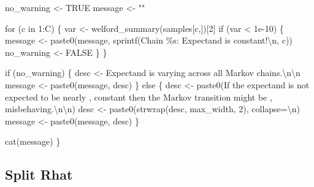 \documentclass[
  letterpaper,
  DIV=11,
  numbers=noendperiod]{scrartcl}
\newenvironment{Shaded}{\begin{snugshade}}{\end{snugshade}}
\newcommand{\AttributeTok}[1]{\textcolor[rgb]{0.40,0.45,0.13}{#1}}
\newcommand{\ConstantTok}[1]{\textcolor[rgb]{0.56,0.35,0.01}{#1}}
\newcommand{\ControlFlowTok}[1]{\textcolor[rgb]{0.00,0.23,0.31}{#1}}
\newcommand{\DecValTok}[1]{\textcolor[rgb]{0.68,0.00,0.00}{#1}}
\newcommand{\FloatTok}[1]{\textcolor[rgb]{0.68,0.00,0.00}{#1}}
\newcommand{\FunctionTok}[1]{\textcolor[rgb]{0.28,0.35,0.67}{#1}}
\newcommand{\NormalTok}[1]{\textcolor[rgb]{0.00,0.23,0.31}{#1}}
\newcommand{\OtherTok}[1]{\textcolor[rgb]{0.00,0.23,0.31}{#1}}
\newcommand{\SpecialCharTok}[1]{\textcolor[rgb]{0.37,0.37,0.37}{#1}}
\newcommand{\StringTok}[1]{\textcolor[rgb]{0.13,0.47,0.30}{#1}}
\begin{document}
\begin{Shaded}
\begin{Highlighting}[]
\NormalTok{  no\_warning }\OtherTok{\textless{}{-}} \ConstantTok{TRUE}
\NormalTok{  message }\OtherTok{\textless{}{-}} \StringTok{""}

  \ControlFlowTok{for}\NormalTok{ (c }\ControlFlowTok{in} \DecValTok{1}\SpecialCharTok{:}\NormalTok{C) \{}
\NormalTok{    var }\OtherTok{\textless{}{-}} \FunctionTok{welford\_summary}\NormalTok{(samples[c,])[}\DecValTok{2}\NormalTok{]}
    \ControlFlowTok{if}\NormalTok{ (var }\SpecialCharTok{\textless{}} \FloatTok{1e{-}10}\NormalTok{) \{}
\NormalTok{      message }\OtherTok{\textless{}{-}} \FunctionTok{paste0}\NormalTok{(message,}
                        \FunctionTok{sprintf}\NormalTok{(}\StringTok{\textquotesingle{}Chain \%s: Expectand is constant!}\SpecialCharTok{\textbackslash{}n}\StringTok{\textquotesingle{}}\NormalTok{, c))}
\NormalTok{      no\_warning }\OtherTok{\textless{}{-}} \ConstantTok{FALSE}
\NormalTok{    \}}
\NormalTok{  \}}
  
  \ControlFlowTok{if}\NormalTok{ (no\_warning) \{}
\NormalTok{    desc }\OtherTok{\textless{}{-}} \StringTok{\textquotesingle{}Expectand is varying across all Markov chains.}\SpecialCharTok{\textbackslash{}n\textbackslash{}n}\StringTok{\textquotesingle{}}
\NormalTok{    message }\OtherTok{\textless{}{-}} \FunctionTok{paste0}\NormalTok{(message, desc)}
\NormalTok{  \} }\ControlFlowTok{else}\NormalTok{ \{}
\NormalTok{    desc }\OtherTok{\textless{}{-}} \FunctionTok{paste0}\NormalTok{(}\StringTok{\textquotesingle{}If the expectand is not expected to be nearly \textquotesingle{}}\NormalTok{,}
                   \StringTok{\textquotesingle{}constant then the Markov transition might be \textquotesingle{}}\NormalTok{,}
                   \StringTok{\textquotesingle{}misbehaving.}\SpecialCharTok{\textbackslash{}n\textbackslash{}n}\StringTok{\textquotesingle{}}\NormalTok{)}
\NormalTok{    desc }\OtherTok{\textless{}{-}} \FunctionTok{paste0}\NormalTok{(}\FunctionTok{strwrap}\NormalTok{(desc, max\_width, }\DecValTok{2}\NormalTok{), }\AttributeTok{collapse=}\StringTok{\textquotesingle{}}\SpecialCharTok{\textbackslash{}n}\StringTok{\textquotesingle{}}\NormalTok{)}
\NormalTok{    message }\OtherTok{\textless{}{-}} \FunctionTok{paste0}\NormalTok{(message, desc)}
\NormalTok{  \}}
  
  \FunctionTok{cat}\NormalTok{(message)}
\NormalTok{\}}
\end{Highlighting}
\end{Shaded}

\hypertarget{split-rhat}{%
\subsection{Split Rhat}\label{split-rhat}}
\end{document}

